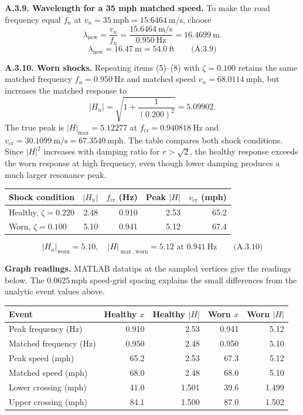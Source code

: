 \textbf{A.3.9. Wavelength for a 35 mph matched speed.} To make the road frequency equal $f_n$ at $v_n=35\ \mathrm{mph}=15.6464\ \mathrm{m/s}$, choose
\[
\lambda_{\mathrm{new}}=\frac{v_n}{f_n}
=\frac{15.6464\ \mathrm{m/s}}{0.950\ \mathrm{Hz}}
=16.4699\ \mathrm{m}.
\]
\[\boxed{\lambda_{\mathrm{new}}=16.47\ \mathrm{m}=54.0\ \mathrm{ft}}\qquad\text{(A.3.9)}\]

\textbf{A.3.10. Worn shocks.} Repeating items (5)--(8) with $\zeta=0.100$ retains the same matched frequency $f_n=0.950\ \mathrm{Hz}$ and matched speed $v_n=68.0114\ \mathrm{mph}$, but increases the matched response to
\[
|H_n|=\sqrt{1+\frac{1}{(0.200)^2}}=5.09902.
\]
The true peak is $|H|_{\max}=5.12277$ at $f_{\mathrm{cr}}=0.940818\ \mathrm{Hz}$ and $v_{\mathrm{cr}}=30.1099\ \mathrm{m/s}=67.3540\ \mathrm{mph}$. The table compares both shock conditions. Since $|H|^2$ increases with damping ratio for $r>\sqrt{2}$, the healthy response exceeds the worn response at high frequency, even though lower damping produces a much larger resonance peak.
{\begin{center}\small\begin{tabular}{@{}lrrrr@{}}
\toprule\noalign{}
Shock condition & $|H_n|$ & $f_{\mathrm{cr}}$ (Hz) & Peak $|H|$ & $v_{\mathrm{cr}}$ (mph) \\
\midrule\noalign{}
Healthy, $\zeta=0.220$ & 2.48 & 0.910 & 2.53 & 65.2 \\
Worn, $\zeta=0.100$ & 5.10 & 0.941 & 5.12 & 67.4 \\
\bottomrule\end{tabular}\end{center}}

\[\boxed{|H_n|_{\mathrm{worn}}=5.10,\quad |H|_{\max,\mathrm{worn}}=5.12\text{ at }0.941\ \mathrm{Hz}}\qquad\text{(A.3.10)}\]

\textbf{Graph readings.} MATLAB datatips at the sampled vertices give the readings below. The $0.0625\,\mathrm{mph}$ speed-grid spacing explains the small differences from the analytic event values above.
\begin{center}\small
\begin{tabular}{@{}lrrrr@{}}
\toprule
Event & Healthy $x$ & Healthy $|H|$ & Worn $x$ & Worn $|H|$ \\
\midrule
Peak frequency (Hz) & 0.910 & 2.53 & 0.941 & 5.12 \\
Matched frequency (Hz) & 0.950 & 2.48 & 0.950 & 5.10 \\
Peak speed (mph) & 65.2 & 2.53 & 67.3 & 5.12 \\
Matched speed (mph) & 68.0 & 2.48 & 68.0 & 5.10 \\
Lower crossing (mph) & 41.0 & 1.501 & 39.6 & 1.499 \\
Upper crossing (mph) & 84.1 & 1.500 & 87.0 & 1.502 \\
\bottomrule
\end{tabular}
\end{center}
\clearpage
{}

